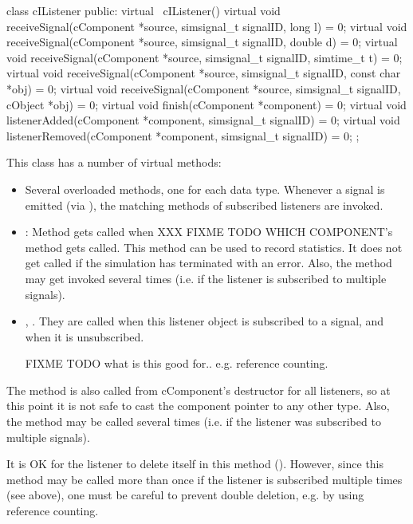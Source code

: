 \begin{note}
\begin{note}
\begin{cpp}
class cIListener
{
  public:
    virtual ~cIListener() {}
    virtual void receiveSignal(cComponent *source, simsignal_t signalID, long l) = 0;
    virtual void receiveSignal(cComponent *source, simsignal_t signalID, double d) = 0;
    virtual void receiveSignal(cComponent *source, simsignal_t signalID, simtime_t t) = 0;
    virtual void receiveSignal(cComponent *source, simsignal_t signalID, const char *obj) = 0;
    virtual void receiveSignal(cComponent *source, simsignal_t signalID, cObject *obj) = 0;
    virtual void finish(cComponent *component) = 0;
    virtual void listenerAdded(cComponent *component, simsignal_t signalID) = 0;
    virtual void listenerRemoved(cComponent *component, simsignal_t signalID) = 0;
};
\end{cpp}

This class has a number of virtual methods:

\begin{itemize}
  \item Several overloaded  methods, one for each
    data type. Whenever a signal is emitted (via ),
    the matching  methods of subscribed listeners
    are invoked.
  \item {}: Method gets called when XXX FIXME TODO WHICH COMPONENT's
     method gets called. This method can be used to record
    statistics. It does not get called if the simulation has terminated
    with an error. Also, the method may get invoked several times (i.e.
    if the listener is subscribed to multiple signals).
  \item {}, . They are called
    when this listener object is subscribed to a signal, and when it is
    unsubscribed.

    FIXME TODO what is this good for.. e.g. reference counting.
\end{itemize}

The  method is also called from cComponent's destructor for all
listeners, so at this point it is not safe to cast the component pointer
to any other type. Also, the method may be called several times (i.e.
if the listener was subscribed to multiple signals).

It is OK for the listener to delete itself in this method ().
However, since this method may be called more than once
if the listener is subscribed multiple times (see above), one must be
careful to prevent double deletion, e.g. by using reference counting.


\end{note}
\end{note}
